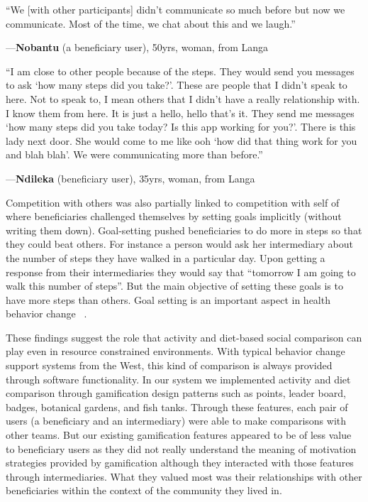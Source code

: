 \documentclass{sig-alternate}
\newenvironment{myquote}
               {\list{}{\rightmargin   \leftmargin
                        \parsep        0in }%
                \item\relax}
               {\endlist}
\newcommand{\userquote}[2]{\begin{samepage}\begin{myquote} 
     \em{\small{#2\begin{flushright}---#1\end{flushright}}}
   \end{myquote}\end{samepage}}
\begin{document}
\userquote{\textbf{Nobantu} (a beneficiary user), 50yrs, woman, from Langa} 
{``We [with other participants] didn't communicate so much before but 
now we communicate. Most of the time, we chat about this and we laugh.''}

\userquote{\textbf{Ndileka} (beneficiary user), 35yrs, woman, from Langa}
{``I am close to other people because of the steps. They would send 
you messages to ask `how many steps did you take?'. These are people that I 
didn't speak to here. Not to speak to, I mean others that I didn't have a 
really relationship with. I know them from here. It is just a hello, hello 
that's it. They send me messages `how many steps did you take today? Is this 
app working for you?'. There is this lady next door. She would come to me 
like ooh `how did that thing work for you and blah blah'. We were 
communicating more than before.''}

Competition with others was also partially linked to competition with self of
where beneficiaries challenged themselves by setting goals implicitly (without
writing them down). Goal-setting pushed beneficiaries to do more in steps so
that they could beat others. For instance a person would ask her intermediary
about the number of steps they have walked in a particular day. Upon getting a
response from their intermediaries they would say that ``tomorrow I am going
to walk this number of steps''. But the main objective of setting these goals
is to have more steps than others. Goal setting is an important aspect in
health behavior change ~\cite{strecher1995goal}.

These findings suggest the role that activity and diet-based social comparison
can play even in resource constrained environments. With typical behavior
change support systems from the West, this kind of comparison is always
provided through software functionality. In our system we implemented activity
and diet comparison through gamification design patterns such as points,
leader board, badges, botanical gardens, and fish tanks. Through these
features, each pair of users (a beneficiary and an intermediary) were able
to make comparisons with other teams. But our existing gamification features
appeared to be of less value to beneficiary users as they did not really
understand the meaning of motivation strategies provided by gamification
although they interacted with those features through intermediaries. What they
valued most was their relationships with other beneficiaries within the
context of the community they lived in.
\end{document}
